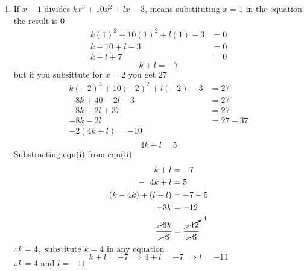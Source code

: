 \begin{multicols}{2}
\begin{enumerate}[label={\textbf{\arabic*.}}]
    \item If $x-1$ divides $kx^3+10x^2+lx-3$, means substituting $x=1$ in the equation the result is $0$
      \begin{align*}
        k(1)^3+10(1)^2+l(1)-3 &= 0 \\
        k + 10 + l - 3 &= 0 \\
        k + l + 7 &= 0
      \end{align*}
      \begin{equation}\tag{i}
        k + l = -7
      \end{equation} \vspace{-5pt}
      but if you subsittute for $x = 2$ you get $27$ \\ \vspace{-10pt}
      \begin{align*}
        k(-2)^3 + 10(-2)^2 + l(-2) - 3 &= 27 \\
        -8k + 40 -2l -3 &= 27 \\
        -8k - 2l + 37 &= 27 \\
        -8k -2l &= 27 - 37 \\
        -2(4k + l) = -10 \\
      \end{align*}
      \begin{equation}\tag{ii}
        4k + l = 5
      \end{equation}
      Substracting equ(i) from equ(ii)
      \begin{align*}
        k + l &= -7 \\
        -\hspace{6pt} 4k + l  &= 5 \\
        (k - 4k ) + (l - l) & = -7 - 5  \\
        -3k & = -12 \\
        \cfrac{\cancel{-3}k}{\cancel{-3}} & = \cfrac{\cancelto{4}{-12}}{\cancel{-3}}
      \end{align*}
      $\therefore k = 4, \text{ substitute } k = 4 \text{ in any equation }$
      \[k+l = -7 \,\, \Rightarrow 4 + l = -7 \,\, \Rightarrow l = -11\]
      $\therefore k = 4 \text{ and } l = -11$


\end{enumerate}
\end{multicols}
